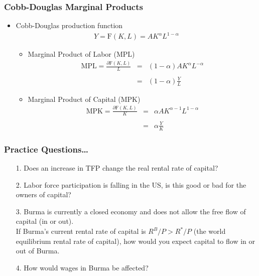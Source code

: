 \documentclass[handout]{beamer}
\begin{document}
\begin{frame}[t]
\frametitle{Cobb-Douglas Marginal Products}
\begin{itemize}
\item Cobb-Douglas production function
\begin{eqnarray*}
Y = \mbox{F}(K,L) = A K^\alpha L^{1-\alpha}
\end{eqnarray*}
\begin{itemize}
\item Marginal Product of Labor (MPL)
\begin{eqnarray*}
\mbox{MPL} = \frac{\partial \mbox{F}(K,L)}{L} &=& (1-\alpha)A K^\alpha L^{-\alpha}\\
\\
 &=& (1-\alpha) \frac{Y}{L}
\end{eqnarray*}
\medskip
\item Marginal Product of Capital (MPK)
\begin{eqnarray*}
\mbox{MPK} = \frac{\partial \mbox{F}(K,L)}{K} &=&\alpha A K^{\alpha-1} L^{1-\alpha}\\
\\
 &=& \alpha \frac{Y}{K}
\end{eqnarray*}
\end{itemize}
\end{itemize}
\end{frame}



\begin{frame}[t]
\frametitle{Practice Questions\ldots}
\begin{itemize}
\item[1.] Does an increase in TFP change the real rental rate of capital?
\bigskip
\item[2.] Labor force participation is falling in the US, is this good or bad for the owners of capital?
\bigskip
\item[3.] Burma is currently a closed economy and does not allow the free flow of capital (in or out).\\
\medskip
If Burma's current rental rate of capital is $R^B/P > R^*/P$ (the world equilibrium rental rate of capital), how would you expect capital to flow in or out of Burma.
\medskip
\item[4.] How would wages in Burma be affected?
\end{itemize}
\end{frame}
\end{document}
